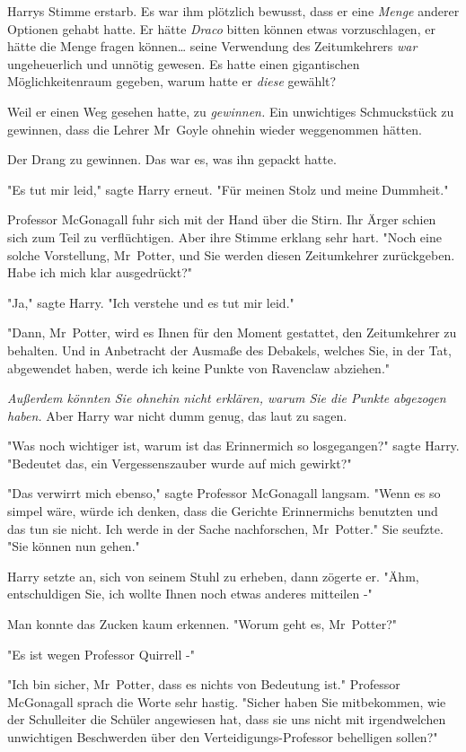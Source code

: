 {Harrys Stimme erstarb. Es war ihm plötzlich bewusst, dass er eine \emph{Menge} anderer Optionen gehabt hatte. Er hätte \emph{Draco} bitten können etwas vorzuschlagen, er hätte die Menge fragen können… seine Verwendung des Zeitumkehrers \emph{war} ungeheuerlich und unnötig gewesen. Es hatte einen gigantischen Möglichkeitenraum gegeben, warum hatte er \emph{diese} gewählt?

Weil er einen Weg gesehen hatte, zu \emph{gewinnen.} Ein unwichtiges Schmuckstück zu gewinnen, dass die Lehrer Mr~Goyle ohnehin wieder weggenommen hätten.

Der Drang zu gewinnen. Das war es, was ihn gepackt hatte.

"Es tut mir leid," sagte Harry erneut. "Für meinen Stolz und meine Dummheit."

Professor McGonagall fuhr sich mit der Hand über die Stirn. Ihr Ärger schien sich zum Teil zu verflüchtigen. Aber ihre Stimme erklang sehr hart. "Noch eine solche Vorstellung, Mr~Potter, und Sie werden diesen Zeitumkehrer zurückgeben. Habe ich mich klar ausgedrückt?"

"Ja," sagte Harry. "Ich verstehe und es tut mir leid."

"Dann, Mr~Potter, wird es Ihnen für den Moment gestattet, den Zeitumkehrer zu behalten. Und in Anbetracht der Ausmaße des Debakels, welches Sie, in der Tat, abgewendet haben, werde ich keine Punkte von Ravenclaw abziehen."

\emph{Außerdem könnten Sie ohnehin nicht erklären, warum Sie die Punkte} \emph{abgezogen haben.} Aber Harry war nicht dumm genug, das laut zu sagen.

"Was noch wichtiger ist, warum ist das Erinnermich so losgegangen?" sagte Harry. "Bedeutet das, ein Vergessenszauber wurde auf mich gewirkt?"

"Das verwirrt mich ebenso," sagte Professor McGonagall langsam. "Wenn es so simpel wäre, würde ich denken, dass die Gerichte Erinnermichs benutzten und das tun sie nicht. Ich werde in der Sache nachforschen, Mr~Potter." Sie seufzte. "Sie können nun gehen."

Harry setzte an, sich von seinem Stuhl zu erheben, dann zögerte er. "Ähm, entschuldigen Sie, ich wollte Ihnen noch etwas anderes mitteilen -"

Man konnte das Zucken kaum erkennen. "Worum geht es, Mr~Potter?"

"Es ist wegen Professor Quirrell -"

"Ich bin sicher, Mr~Potter, dass es nichts von Bedeutung ist." Professor McGonagall sprach die Worte sehr hastig. "Sicher haben Sie mitbekommen, wie der Schulleiter die Schüler angewiesen hat, dass sie uns nicht mit irgendwelchen unwichtigen Beschwerden über den Verteidigungs-Professor behelligen sollen?"

}
